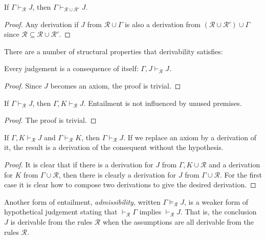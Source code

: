 \begin{lemma}[Stability]
    If $\Gamma \vdash_{\mathcal{R}} J$, then $\Gamma \vdash_{\mathcal{R} \cup \mathcal{R'}} J$.
\end{lemma}

\begin{proof}
    Any derivation if $J$ from $\mathcal{R} \cup \Gamma$ is also a derivation from $(\mathcal{R} \cup \mathcal{R}') \cup \Gamma$ since $\mathcal{R} \subseteq \mathcal{R}\cup \mathcal{R}'$.
\end{proof}

There are a number of structural properties that derivability satisfies:

\begin{lemma}[Reflexivity]
    Every judgement is a consequence of itself: $\Gamma, J\vdash_{\mathcal{R}} J$.
\end{lemma}

\begin{proof}
    Since $J$ becomes an axiom, the proof is trivial.
\end{proof}


\begin{lemma}[Weakening]
    If $\Gamma \vdash_{\mathcal{R}} J$, then $\Gamma, K \vdash_{\mathcal{R}} J$. Entailment is not influenced by unused premises.
\end{lemma}

\begin{proof}
    The proof is trivial.
\end{proof}


\begin{lemma}[Transitivity]\label{derivability_transitivity}
    If $\Gamma, K \vdash_{\mathcal{R}} J$ and $\Gamma \vdash_{\mathcal{R}} K$, then $\Gamma \vdash_{\mathcal{R}} J$. If we replace an axiom by a derivation of it, the result is a derivation of the consequent without the hypothesis.
\end{lemma}

\begin{proof}
    It is clear that if there is a derivation for $J$ from $\Gamma,K \cup \mathcal{R}$ and a derivation for $K$ from $\Gamma \cup \mathcal{R}$, then there is clearly a derivation for $J$ from $\Gamma \cup \mathcal{R}$. For the first case it is clear how to compose two derivations to give the desired derivation.
\end{proof}

\begin{defin}
    Another form of entailment, \emph{admissibility}, written $\Gamma \vDash_{\mathcal{R}} J$, is a weaker form of hypothetical judgement stating that $\vdash_{\mathcal{R}} \Gamma$ implies $\vdash_{\mathcal{R}} J$. That is, the conclusion $J$ is derivable from the rules $\mathcal{R}$ when the assumptions are all derivable from the rules $\mathcal{R}$.
\end{defin}

